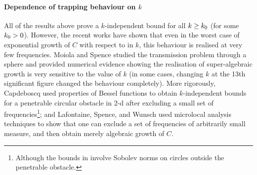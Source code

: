 \paragraph{Dependence of trapping behaviour on $k$} All of the results above prove a $k$-independent bound for all $k \geq k_{0}$ (for some $k_{0} > 0$). However, the recent works \cite{Ca:12,MoSp:19,LaSpWu:19} have shown that even in the worst case of exponential growth of $C$ with respect to in $k$, this behaviour is realised at very few frequencies. Moiola and Spence \cite{MoSp:19} studied the transmission problem through a sphere and provided numerical evidence showing the realisation of super-algebraic growth is very sensitive to the value of $k$ (in some cases, changing $k$ at the 13th significant figure changed the behaviour completely). More rigorously, Capdeboscq \cite{Ca:12} used properties of Bessel functions to obtain $k$-independent bounds for a penetrable circular obstacle in 2-d after excluding a small set of frequencies\footnote{Although the bounds in \cite{Ca:12} involve Sobolev norms on circles outside the penetrable obstacle.}; and Lafontaine, Spence, and Wunsch \cite{LaSpWu:19} used microlocal analysis techniques to show that one can exclude a set of frequencies of arbitrarily small measure, and then obtain merely algebraic growth of $C$.

